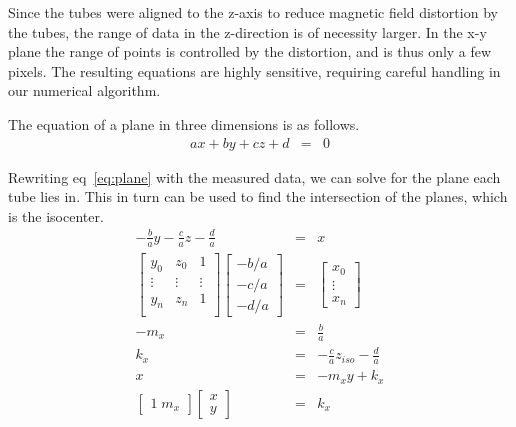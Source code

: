 Since the tubes were aligned to the z-axis to reduce magnetic field distortion by the tubes, the range of data in the z-direction is of necessity larger.  In the x-y plane the range of points is controlled by the distortion, and is thus only a few pixels.  The resulting equations are highly sensitive, requiring careful handling in our numerical algorithm.

The equation of a plane in three dimensions is as follows.
\begin{eqnarray}
ax + by + cz + d & = & 0 \label{eq:plane}
\end{eqnarray}

Rewriting eq~\ref{eq:plane} with the measured data, we can solve for the plane each tube lies in.  This in turn can be used to find the intersection of the planes, which is the isocenter.
\begin{eqnarray}
-\frac{b}{a}y - \frac{c}{a}z - \frac{d}{a} & = & x \label{eq:x_orient}\\
\begin{bmatrix}
  y_0  & z_0 & 1 \\
  \vdots & \vdots & \vdots \\
  y_n & z_n & 1 \\
\end{bmatrix}
\begin{bmatrix}
-b/a\\
-c/a\\
-d/a
\end{bmatrix}
& = &
\begin{bmatrix}
x_0 \\
\vdots\\
x_n
\end{bmatrix} \nonumber\\
-m_x & = & \frac{b}{a} \nonumber\\
 k_x & = & - \frac{c}{a}z_{iso} - \frac{d}{a} \nonumber\\
  x  & = & -m_x y + k_x \nonumber\\
\begin{bmatrix}
1 \; m_x
\end{bmatrix}
\begin{bmatrix}
x \\
y
\end{bmatrix}
& = &
k_x \label{eq:x_est}
\end{eqnarray}

